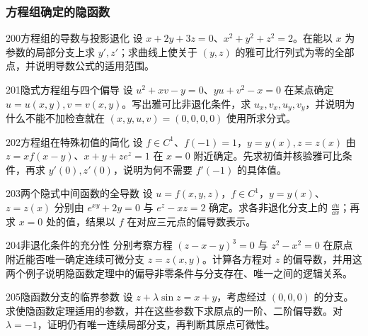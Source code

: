 \subsubsection{方程组确定的隐函数}
\begin{exercise}{200}{方程组的导数与投影退化}
设 $x+2y+3z=0$、$x^2+y^2+z^2=2$。在能以 $x$ 为参数的局部分支上求 $y',z'$；求曲线上使关于 $(y,z)$ 的雅可比行列式为零的全部点，并说明导数公式的适用范围。
\end{exercise}
\begin{exercise}{201}{隐式方程组与四个偏导}
设 $u^2+xv-y=0$、$yu+v^2-x=0$ 在某点确定 $u=u(x,y),v=v(x,y)$。写出雅可比非退化条件，求 $u_x,v_x,u_y,v_y$，并说明为什么不能不加检查就在 $(x,y,u,v)=(0,0,0,0)$ 使用所求分式。
\end{exercise}
\begin{exercise}{202}{方程组在特殊初值的简化}
设 $f\in C^1$、$f(-1)=1$，$y=y(x),z=z(x)$ 由 $z=xf(x-y)$、$x+y+ze^z=1$ 在 $x=0$ 附近确定。先求初值并核验雅可比条件，再求 $y'(0),z'(0)$，说明为何不需要 $f'(-1)$ 的具体值。
\end{exercise}
\begin{exercise}{203}{两个隐式中间函数的全导数}
设 $u=f(x,y,z)$，$f\in C^1$，$y=y(x)$、$z=z(x)$ 分别由 $e^{xy}+2y=0$ 与 $e^z-xz=2$ 确定。求各非退化分支上的 $\frac{\dd u}{\dd x}$；再求 $x=0$ 处的值，结果以 $f$ 在对应三元点的偏导数表示。
\end{exercise}
\begin{exercise}{204}{非退化条件的充分性}
分别考察方程 $(z-x-y)^3=0$ 与 $z^2-x^2=0$ 在原点附近能否唯一确定连续可微分支 $z=z(x,y)$。计算各方程对 $z$ 的偏导数，并用这两个例子说明隐函数定理中的偏导非零条件与分支存在、唯一之间的逻辑关系。
\end{exercise}
\begin{exercise}{205}{隐函数分支的临界参数}
设 $z+\lambda\sin z=x+y$，考虑经过 $(0,0,0)$ 的分支。求使隐函数定理适用的参数，并在这些参数下求原点的一阶、二阶偏导数。对 $\lambda=-1$，证明仍有唯一连续局部分支，再判断其原点可微性。
\end{exercise}
